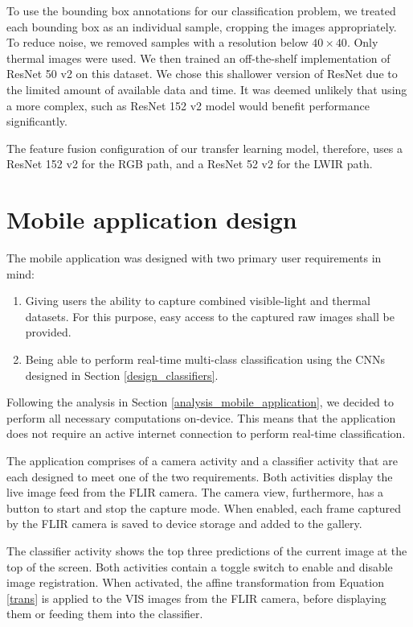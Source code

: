 \documentclass{l4proj}
\begin{document}
To use the bounding box annotations for our classification problem, we treated each bounding box as an individual sample, cropping the images appropriately. To reduce noise, we removed samples with a resolution below $40 \times 40$. Only thermal images were used. We then trained an off-the-shelf implementation of ResNet 50 v2 on this dataset. We chose this shallower version of ResNet due to the limited amount of available data and time. It was deemed unlikely that using a more complex, such as ResNet 152 v2 model would benefit performance significantly.

The feature fusion configuration of our transfer learning model, therefore, uses a ResNet 152 v2 for the RGB path, and a ResNet 52 v2 for the LWIR path.


\section{Mobile application design}

The mobile application was designed with two primary user requirements in mind:

\begin{enumerate}
  \item Giving users the ability to capture combined visible-light and thermal datasets. For this purpose, easy access to the captured raw images shall be provided.
  \item Being able to perform real-time multi-class classification using the CNNs designed in Section \ref{design_classifiers}.
\end{enumerate}

Following the analysis in Section \ref{analysis_mobile_application}, we decided to perform all necessary computations on-device. This means that the application does not require an active internet connection to perform real-time classification. 

The application comprises of a camera activity and a classifier activity that are each designed to meet one of the two requirements. Both activities display the live image feed from the FLIR camera. The camera view, furthermore, has a button to start and stop the capture mode. When enabled, each frame captured by the FLIR camera is saved to device storage and added to the gallery.

The classifier activity shows the top three predictions of the current image at the top of the screen. Both activities contain a toggle switch to enable and disable image registration. When activated, the affine transformation from Equation \ref{trans} is applied to the VIS images from the FLIR camera, before displaying them or feeding them into the classifier.
\end{document}
